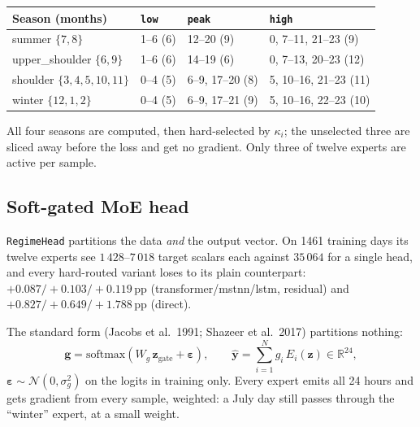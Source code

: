 \documentclass[11pt]{article}
\newcommand{\R}{\mathbb{R}}
\newcommand{\code}[1]{\texttt{\small #1}}
\newcommand{\softmax}{\mathrm{softmax}}
\begin{document}
\begin{center}\small
\begin{tabular}{@{}llll@{}}
\toprule
Season (months) & \code{low} & \code{peak} & \code{high} \\
\midrule
summer $\{7,8\}$           & 1--6 \hfill(6) & 12--20 \hfill(9)       & 0, 7--11, 21--23 \hfill(9) \\
upper\_shoulder $\{6,9\}$  & 1--6 \hfill(6) & 14--19 \hfill(6)       & 0, 7--13, 20--23 \hfill(12) \\
shoulder $\{3,4,5,10,11\}$ & 0--4 \hfill(5) & 6--9, 17--20 \hfill(8) & 5, 10--16, 21--23 \hfill(11) \\
winter $\{12,1,2\}$        & 0--4 \hfill(5) & 6--9, 17--21 \hfill(9) & 5, 10--16, 22--23 \hfill(10) \\
\bottomrule
\end{tabular}
\end{center}

\noindent
All four seasons are computed, then hard-selected by $\kappa_i$; the unselected
three are sliced away before the loss and get no gradient. Only three of twelve
experts are active per sample.

\subsection{Soft-gated MoE head}\label{sec:smoe}

\code{RegimeHead} partitions the data \emph{and} the output vector. On 1461 training
days its twelve experts see $1\,428$--$7\,018$ target scalars each against $35\,064$
for a single head, and every hard-routed variant loses to its plain counterpart:
$+0.087/+0.103/+0.119$\,pp (transformer/mstnn/lstm, residual) and
$+0.827/+0.649/+1.788$\,pp (direct).

The standard form (Jacobs et al.\ 1991; Shazeer et al.\ 2017) partitions nothing:
\begin{equation}
  \mathbf{g} = \softmax\!\left(W_g\,\mathbf{z}_{\text{gate}} + \boldsymbol\varepsilon\right),
  \qquad
  \hat{\mathbf{y}} = \sum_{i=1}^{N} g_i\,E_i(\mathbf{z}) \in \R^{24},
\end{equation}
$\boldsymbol\varepsilon \sim \mathcal{N}(0,\sigma_g^2)$ on the logits in training only.
Every expert emits all 24 hours and gets gradient from every sample, weighted: a July
day still passes through the ``winter'' expert, at a small weight.
\end{document}
